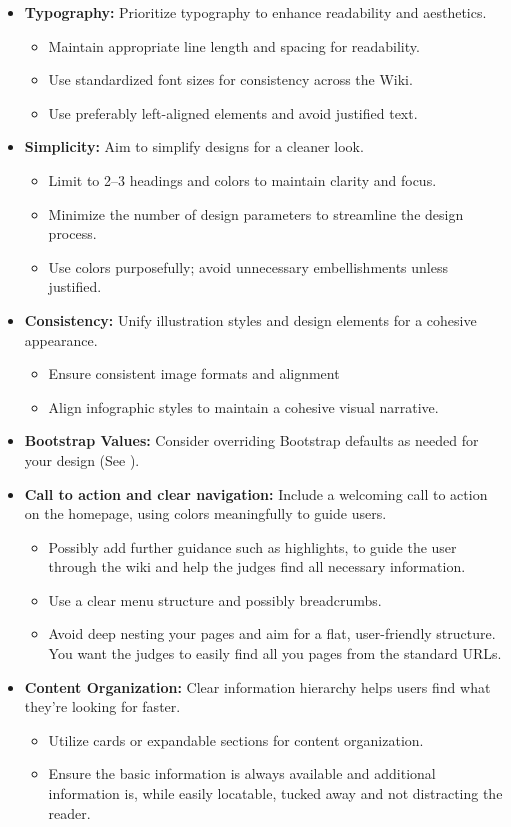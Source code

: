 \begin{itemize}
    \item \textbf{Typography:} Prioritize typography to enhance readability and aesthetics.
    \begin{itemize}
        \item Maintain appropriate line length and spacing for readability.
        \item Use standardized font sizes for consistency across the Wiki.
        \item Use preferably left-aligned elements and avoid justified text.
    \end{itemize}
    \item \textbf{Simplicity:} Aim to simplify designs for a cleaner look.
    \begin{itemize}
        \item Limit to 2--3 headings and colors to maintain clarity and focus.
        \item Minimize the number of design parameters to streamline the design process.
        \item Use colors purposefully; avoid unnecessary embellishments unless justified.
    \end{itemize}
    \item \textbf{Consistency:} Unify illustration styles and design elements for a cohesive appearance.
    \begin{itemize}
        \item Ensure consistent image formats and alignment
        \item Align infographic styles to maintain a cohesive visual narrative.
    \end{itemize}
    \item \textbf{Bootstrap Values:} Consider overriding Bootstrap defaults as needed for your design (See ).
    \item \textbf{Call to action and clear navigation:} Include a welcoming call to action on the homepage, using colors meaningfully to guide users.
    \begin{itemize}
        \item Possibly add further guidance such as highlights, to guide the user through the wiki and help the judges find all necessary information.
        \item Use a clear menu structure and possibly breadcrumbs.
        \item Avoid deep nesting your pages and aim for a flat, user-friendly structure.
        You want the judges to easily find all you pages from the standard URLs.
    \end{itemize}
    \item \textbf{Content Organization:} Clear information hierarchy helps users find what they’re looking for faster.
    \begin{itemize}
        \item Utilize cards or expandable sections for content organization.
        \item Ensure the basic information is always available and additional information is, while easily locatable, tucked away and not distracting the reader.
    \end{itemize}
\end{itemize}
